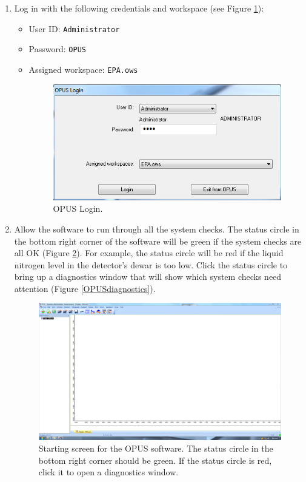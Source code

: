 \begin{enumerate}
    \item Log in with the following credentials and workspace (see Figure \ref{OPUS_Login}):
    \begin{itemize}
        \item User ID: \verb|Administrator|
        \item Password: \verb|OPUS|
        \item Assigned workspace: \verb|EPA.ows|
\begin{figure}[htb]
\begin{center}
\includegraphics[]{OPUS_Login.PNG}
\caption{OPUS Login.}
\label{OPUS_Login}
\end{center}
\end{figure}

    \end{itemize}
    \item Allow the software to run through all the system checks. The status circle in the bottom right corner of the software will be green if the system checks are all OK (Figure \ref{EPA_ows}). For example, the status circle will be red if the liquid nitrogen level in the detector's dewar is too low. Click the status circle to bring up a diagnostics window that will show which system checks need attention (Figure \ref{OPUSdiagnostics}).
\begin{figure}[htb]
    \centering
    \includegraphics[width=6.5in]{EPA_ows_green.PNG}
    \caption{Starting screen for the OPUS software. The status circle in the bottom right corner should be green. If the status circle is red, click it to open a diagnostics window.}
    \label{EPA_ows}
\end{figure}


\end{enumerate}
